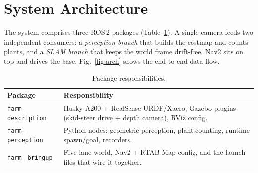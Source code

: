 \documentclass[10pt,journal,twoside]{IEEEtran}
\begin{document}
\section{System Architecture}
The system comprises three ROS\,2 packages (Table~\ref{tab:pkg}). A single camera feeds two independent consumers: a \emph{perception branch} that builds the costmap and counts plants, and a \emph{SLAM branch} that keeps the world frame drift-free. Nav2 sits on top and drives the base. Fig.~\ref{fig:arch} shows the end-to-end data flow.

\begin{table}[!t]
\centering
\caption{Package responsibilities.}
\label{tab:pkg}
\footnotesize
\begin{tabular}{@{}p{}p{}@{}}
\toprule
\textbf{Package} & \textbf{Responsibility} \\
\midrule
\texttt{farm\_} \texttt{description} & Husky A200 + RealSense URDF/Xacro, Gazebo plugins (skid-steer drive + depth camera), RViz config. \\
\texttt{farm\_} \texttt{perception} & Python nodes: geometric perception, plant counting, runtime spawn/goal, recorders. \\
\texttt{farm\_} \texttt{bringup} & Five-lane world, Nav2 + RTAB-Map config, and the launch files that wire it together. \\
\bottomrule
\end{tabular}
\end{table}
\end{document}

